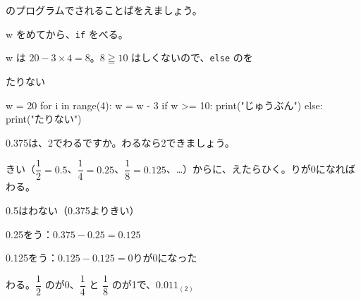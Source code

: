 \begin{reidai}[くり\R{返}{かえ}しのあとで、もし～なら]
\noindent\begin{minipage}[t]{0.55\linewidth}
のプログラムでされることばをえましょう。\par
\kangaekata w をめてから、\texttt{if} をべる。\par
\shiki w は $20-3\times4=8$。$8\geqq10$ はしくないので、\texttt{else} のを\par
\kotae たりない
\end{minipage}\hfill
\begin{minipage}[t]{0.41\linewidth}
\vspace{2pt}
\begin{bkiitcode}
w = 20
for i in range(4):
    w = w - 3
if w >= 10:
    print("じゅうぶん")
else:
    print("たりない")
\end{bkiitcode}
\end{minipage}
\end{reidai}


\begin{reidai}[2\R{進数}{しん|すう}で\R{終}{お}わる\R{小数}{しょう|すう}]
0.375は、2でわるですか。わるなら2できましょう。\par
\kangaekata {}きい（$\dfrac{1}{2}=0.5$、$\dfrac{1}{4}=0.25$、$\dfrac{1}{8}=0.125$、…）からに、えたらひく。りが0になればわる。\par
\shiki 0.5はわない（0.375よりきい）\par
\hspace*{2.6\zw}0.25をう：$0.375-0.25=0.125$\par
\hspace*{2.6\zw}0.125をう：$0.125-0.125=0$\quad {}りが0になった\par
\kotae {}わる。$\dfrac{1}{2}$ のが0、$\dfrac{1}{4}$ と $\dfrac{1}{8}$ のが1で、$0.011_{(2)}$
\end{reidai}

